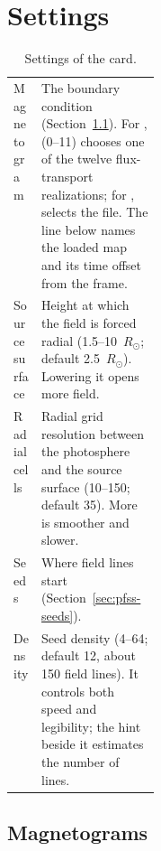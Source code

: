 \section{Settings}

\begin{table}[!htbp]
  \centering
  \caption{Settings of the  card.}
  \label{tab:pfss}
  \small
  \begin{tabularx}{\linewidth}{@{}P{0.19\linewidth}L@{}}
    \toprule
     &  \\
    \midrule
    Magnetogram & The boundary condition (Section~\ref{sec:pfss-magnetograms}). For ,  (0--11) chooses one of the twelve flux-transport realizations; for ,  selects the file. The line below names the loaded map and its time offset from the frame. \\
    Source surface & Height at which the field is forced radial (1.5--10~\(R_\odot\); default 2.5~\(R_\odot\)). Lowering it opens more field. \\
    Radial cells & Radial grid resolution between the photosphere and the source surface (10--150; default 35). More is smoother and slower. \\
    Seeds & Where field lines start (Section~\ref{sec:pfss-seeds}). \\
    Density & Seed density (4--64; default 12, about 150 field lines). It controls both speed and legibility; the hint beside it estimates the number of lines. \\
    \bottomrule
  \end{tabularx}
\end{table}

\subsection{Magnetograms}
\label{sec:pfss-magnetograms}

